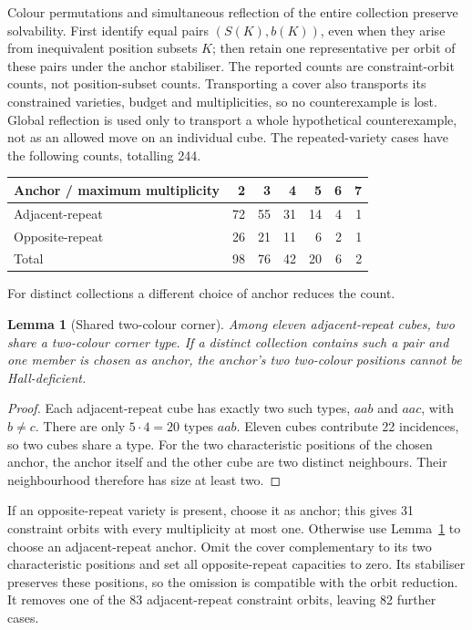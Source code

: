 \documentclass[11pt]{article}
\newtheorem{lemma}[theorem]{Lemma}
\theoremstyle{remark}
\begin{document}
Colour permutations and simultaneous reflection of the entire collection
preserve solvability. First identify equal pairs $(S(K),b(K))$, even when
they arise from inequivalent position subsets $K$; then retain one
representative per orbit of these pairs under the anchor stabiliser.
The reported counts are constraint-orbit counts, not position-subset counts. Transporting a cover also
transports its constrained varieties, budget and multiplicities, so no
counterexample is lost. Global reflection is used only
to transport a whole hypothetical counterexample, not as an allowed move
on an individual cube. The repeated-variety cases have the following counts,
totalling 244.
\begin{center}
\begin{tabular}{lrrrrrr}
\toprule
Anchor / maximum multiplicity & 2 & 3 & 4 & 5 & 6 & 7\\
\midrule
Adjacent-repeat & 72 & 55 & 31 & 14 & 4 & 1\\
Opposite-repeat & 26 & 21 & 11 & 6 & 2 & 1\\
Total & 98 & 76 & 42 & 20 & 6 & 2\\
\bottomrule
\end{tabular}
\end{center}

For distinct collections a different choice of anchor reduces the count.
\begin{lemma}[Shared two-colour corner]\label{lem:shared}
Among eleven adjacent-repeat cubes, two share a two-colour corner type.
If a distinct collection contains such a pair and one member is chosen as
anchor, the anchor's two two-colour positions cannot be Hall-deficient.
\end{lemma}
\begin{proof}
Each adjacent-repeat cube has exactly two such types, $aab$ and $aac$, with
$b\ne c$. There are only $5\cdot4=20$ types $aab$. Eleven cubes contribute
22 incidences, so two cubes share a type. For the two characteristic positions
of the chosen anchor, the anchor itself and the other cube are two distinct
neighbours. Their neighbourhood therefore has size at least two.
\end{proof}
If an opposite-repeat variety is present, choose it as anchor; this gives
31 constraint orbits with every multiplicity at most one. Otherwise use
Lemma~\ref{lem:shared} to choose an adjacent-repeat anchor. Omit the cover
complementary to its two characteristic positions and set all opposite-repeat
capacities to zero. Its stabiliser preserves these positions, so the omission
is compatible with the orbit reduction. It removes one of the 83
adjacent-repeat constraint orbits, leaving 82 further cases.
\end{document}
